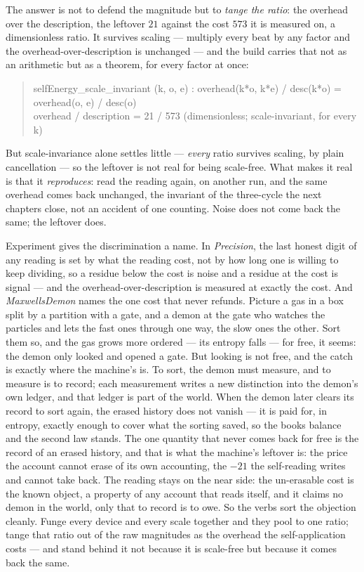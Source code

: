 The answer is not to defend the magnitude but to \emph{tange the ratio}: the overhead over the description, the leftover
$21$ against the cost $573$ it is measured on, a dimensionless ratio.
It survives scaling --- multiply every beat by any factor and the overhead-over-description is unchanged --- and the
build carries that not as an arithmetic but as a theorem, for every factor at once:
\begin{quote}\ttfamily
selfEnergy\_scale\_invariant (k, o, e) : overhead(k*o, k*e) / desc(k*o) = overhead(o, e) / desc(o)\\
overhead / description = 21 / 573   (dimensionless; scale-invariant, for every k)
\end{quote}
But scale-invariance alone settles little --- \emph{every} ratio survives scaling, by plain cancellation --- so the
leftover is not real for being scale-free.
What makes it real is that it \emph{reproduces}: read the reading again, on another run, and the same overhead comes back
unchanged, the invariant of the three-cycle the next chapters close, not an accident of one counting.
Noise does not come back the same; the leftover does.

Experiment gives the discrimination a name.
In \emph{Precision}, the last honest digit of any reading is set by what the reading cost, not by how long one is
willing to keep dividing, so a residue below the cost is noise and a residue at the cost is signal --- and the
overhead-over-description is measured at exactly the cost.
And \emph{MaxwellsDemon} names the one cost that never refunds.
Picture a gas in a box split by a partition with a gate, and a demon at the gate who watches the particles and lets the
fast ones through one way, the slow ones the other.
Sort them so, and the gas grows more ordered --- its entropy falls --- for free, it seems: the demon only looked and
opened a gate.
But looking is not free, and the catch is exactly where the machine's is.
To sort, the demon must measure, and to measure is to record; each measurement writes a new distinction into the demon's
own ledger, and that ledger is part of the world.
When the demon later clears its record to sort again, the erased history does not vanish --- it is paid for, in entropy,
exactly enough to cover what the sorting saved, so the books balance and the second law stands.
The one quantity that never comes back for free is the record of an erased history, and that is what the machine's
leftover is: the price the account cannot erase of its own accounting, the $-21$ the self-reading writes and cannot take
back.
The reading stays on the near side: the un-erasable cost is the known object, a property of any account that reads
itself, and it claims no demon in the world, only that to record is to owe.
So the verbs sort the objection cleanly.
Funge every device and every scale together and they pool to one ratio; tange that ratio out of the raw magnitudes as the
overhead the self-application costs --- and stand behind it not because it is scale-free but because it comes back the same.

